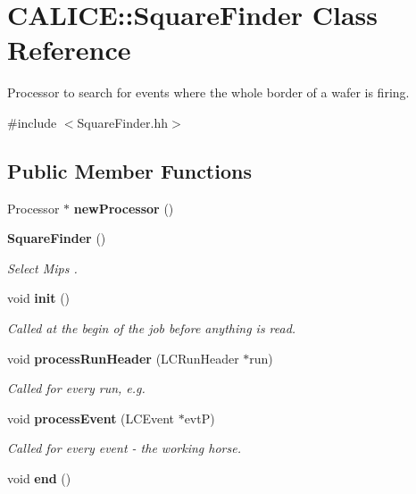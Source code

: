 \section{CALICE::SquareFinder Class Reference}
\label{classCALICE_1_1SquareFinder}


Processor to search for events where the whole border of a wafer is firing.  


{\ttfamily \#include $<$SquareFinder.hh$>$}\subsection*{Public Member Functions}
\begin{DoxyCompactItemize}
\item 
Processor $\ast$ {\bfseries newProcessor} ()\label{classCALICE_1_1SquareFinder_a3f2f49aba9c7f0d76d62de5a6c9e5ee1}

\item 
{\bf SquareFinder} ()
\begin{DoxyCompactList}\small\item\em Select Mips . \item\end{DoxyCompactList}\item 
void {\bf init} ()
\begin{DoxyCompactList}\small\item\em Called at the begin of the job before anything is read. \item\end{DoxyCompactList}\item 
void {\bf processRunHeader} (LCRunHeader $\ast$run)
\begin{DoxyCompactList}\small\item\em Called for every run, e.g. \item\end{DoxyCompactList}\item 
void {\bf processEvent} (LCEvent $\ast$evtP)\label{classCALICE_1_1SquareFinder_ac15ccd383747f853c1480d687f9dba7f}

\begin{DoxyCompactList}\small\item\em Called for every event -\/ the working horse. \item\end{DoxyCompactList}\item 
void {\bfseries end} ()\label{classCALICE_1_1SquareFinder_a93abe832b780c7ce5616ca29d16c72ac}

\end{DoxyCompactItemize}
